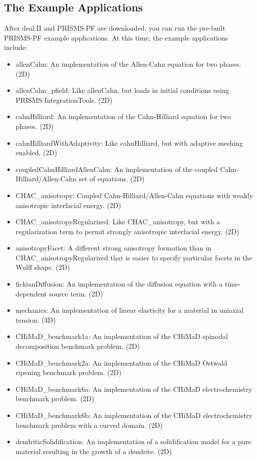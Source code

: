 \documentclass[10pt]{article} %
\begin{document}
\subsection{The Example Applications}
After deal.II and PRISMS-PF are downloaded, you can run the pre-built PRISMS-PF example applications. At this time, the example applications include:
\begin{itemize}
\item allenCahn: An implementation of the Allen-Cahn equation for two phases. (2D)
\item allenCahn\_pfield: Like allenCahn, but loads in initial conditions using PRISMS IntegrationTools. (2D)
\item cahnHilliard: An implementation of the Cahn-Hilliard equation for two phases. (2D)
\item cahnHilliardWithAdaptivity: Like cahnHilliard, but with adaptive meshing enabled. (2D)
\item coupledCahnHilliardAllenCahn: An implementation of the coupled Cahn-Hilliard/Allen-Cahn set of equations. (2D)
\item CHAC\_anisotropy: Coupled Cahn-Hilliard/Allen-Cahn equations with weakly anisotropic interfacial energy. (2D)
\item CHAC\_anisotropyRegularized: Like CHAC\_anisotropy, but with a regularization term to permit strongly anisotropic interfacial energy. (2D)
\item anisotropyFacet: A different strong anisotropy formation than in CHAC\_anisotropyRegularized that is easier to specify particular facets in the Wulff shape. (2D)
\item fickianDiffusion: An implementation of the diffusion equation with a time-dependent source term. (2D)
\item mechanics: An implementation of linear elasticity for a material in uniaxial tension. (3D)
\item CHiMaD\_benchmark1a: An implementation of the CHiMaD spinodal decomposition benchmark problem. (2D)
\item CHiMaD\_benchmark2a: An implementation of the CHiMaD Ostwald ripening benchmark problem. (2D)
\item CHiMaD\_benchmark6a: An implementation of the CHiMaD electrochemistry benchmark problem. (2D)
\item CHiMaD\_benchmark6b: An implementation of the CHiMaD electrochemistry benchmark problem with a curved domain. (2D)
\item dendriticSolidification: An implementation of a solidification model for a pure material resulting in the growth of a dendrite. (2D)

\end{itemize}
\end{document}
